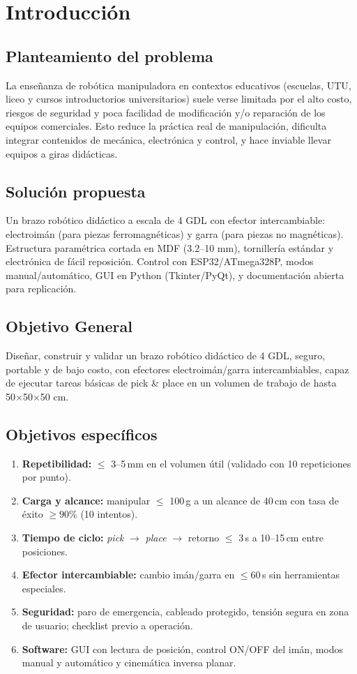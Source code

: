 \section{Introducción}
\subsection{Planteamiento del problema}
La enseñanza de robótica manipuladora en contextos educativos (escuelas, UTU, liceo y cursos introductorios universitarios) suele verse limitada por el alto costo, riesgos de seguridad y poca facilidad de modificación y/o reparación de los equipos comerciales. Esto reduce la práctica real de manipulación, dificulta integrar contenidos de mecánica, electrónica y control, y hace inviable llevar equipos a giras didácticas.


\subsection{Solución propuesta}
Un brazo robótico didáctico a escala de 4 GDL con efector intercambiable: electroimán (para piezas ferromagnéticas) y garra (para piezas no magnéticas). Estructura paramétrica cortada en MDF (3.2–10 mm), tornillería estándar y electrónica de fácil reposición. Control con ESP32/ATmega328P, modos manual/automático, GUI en Python (Tkinter/PyQt), y documentación abierta para replicación.

\subsection{Objetivo General}
Diseñar, construir y validar un brazo robótico didáctico de 4 GDL, seguro, portable y de bajo costo, con efectores electroimán/garra intercambiables, capaz de ejecutar tareas básicas de pick \& place en un volumen de trabajo de hasta 50×50×50 cm.

\subsection{Objetivos específicos}
\begin{enumerate}
  \item \textbf{Repetibilidad:} $\leq$ 3--5\,mm en el volumen útil (validado con 10 repeticiones por punto).
  \item \textbf{Carga y alcance:} manipular $\leq$ 100\,g a un alcance de 40\,cm con tasa de éxito $\geq 90\%$ (10 intentos).
  \item \textbf{Tiempo de ciclo:} \emph{pick} $\rightarrow$ \emph{place} $\rightarrow$ retorno $\leq$ 3\,s a 10--15\,cm entre posiciones.
  \item \textbf{Efector intercambiable:} cambio imán/garra en $\leq 60$\,s sin herramientas especiales.
  \item \textbf{Seguridad:} paro de emergencia, cableado protegido, tensión segura en zona de usuario; checklist previo a operación.
  \item \textbf{Software:} GUI con lectura de posición, control ON/OFF del imán, modos manual y automático y cinemática inversa planar.
\end{enumerate}

